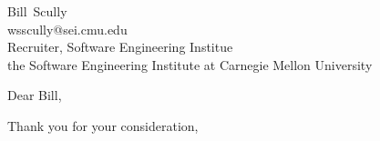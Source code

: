 \documentclass[10pt,letter]{letter}
\makeatletter
\def\firstname{Bill}
\def\lastname{Scully}
\def\hm{\firstname\ \lastname} %
\def\hremail{wsscully@sei.cmu.edu}
\def\position{Recruiter, Software Engineering Institue} %
\def\company{the Software Engineering Institute at Carnegie Mellon University} %
\makeatother
\begin{document}
\begin{letter}{\hm \\ \hremail \\ \position \\ \company}

\opening{Dear \firstname,}

\setlength\parindent{.5in}



 

\closing{Thank you for your consideration,}
\end{letter}
\end{document}
